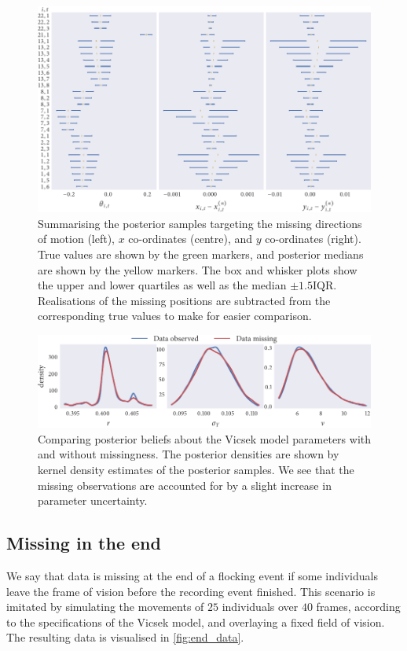 \begin{figure}[tbp]
  \includegraphics{beg/summary.pdf}
  \caption{Summarising the posterior samples targeting the missing directions
  of motion (left), $x$ co-ordinates (centre), and $y$ co-ordinates (right).
  True values are shown by the green markers, and posterior medians are shown
  by the yellow markers. The box and whisker plots show the upper and lower
  quartiles as well as the median $\pm1.5\text{IQR}$. Realisations of the
  missing positions are subtracted from the corresponding true values to make
  for easier comparison.}
  \label{fig:beg_summary}
\end{figure}
\begin{figure}[tbp]
  \includegraphics{beg/compare_params.pdf}
  \caption{Comparing posterior beliefs about the Vicsek model parameters with
  and without missingness. The posterior densities are shown by kernel density
  estimates of the posterior samples. We see that the missing observations are
  accounted for by a slight increase in parameter uncertainty.}
  \label{fig:beg_compare}
\end{figure}

\subsection{Missing in the end}

We say that data is missing at the end of a flocking event if some individuals
leave the frame of vision before the recording event finished. This scenario is
imitated by simulating the movements of $25$ individuals over $40$ frames,
according to the specifications of the Vicsek model, and overlaying a fixed
field of vision. The resulting data is visualised in \cref{fig:end_data}.

